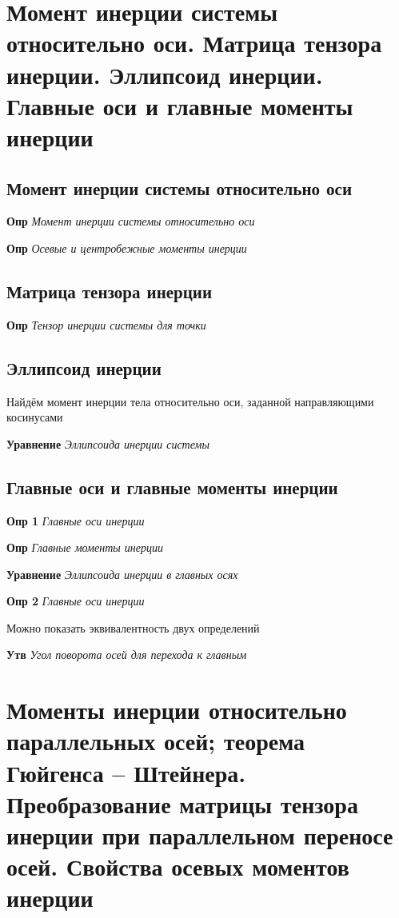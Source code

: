 \documentclass[a4paper, 14pt]{article}
\begin{document}
    \section{Момент инерции системы относительно оси.
    Матрица тензора инерции.
    Эллипсоид инерции.
    Главные оси и главные моменты инерции}
    
    \subsection{Момент инерции системы относительно оси}
    
    \textbf{Опр} \textit{Момент инерции системы относительно оси}
    
    \textbf{Опр} \textit{Осевые и центробежные моменты инерции}
    
    \subsection{Матрица тензора инерции}
    
    \textbf{Опр} \textit{Тензор инерции системы для точки}
    
    \subsection{Эллипсоид инерции}
    
    Найдём момент инерции тела относительно оси, заданной направляющими косинусами
    
    \textbf{Уравнение} \textit{Эллипсоида инерции системы}
    
    \subsection{Главные оси и главные моменты инерции}
    
    \textbf{Опр 1} \textit{Главные оси инерции}
    
    \textbf{Опр} \textit{Главные моменты инерции}
    
    \textbf{Уравнение} \textit{Эллипсоида инерции в главных осях}
    
    \textbf{Опр 2} \textit{Главные оси инерции}
    
    Можно показать эквивалентность двух определений
    
    \textbf{Утв} \textit{Угол поворота осей для перехода к главным}
    
    \section{Моменты инерции относительно параллельных осей; теорема Гюйгенса – Штейнера.
    Преобразование матрицы тензора инерции при параллельном переносе осей.
    Свойства осевых моментов инерции}
    
\end{document}
